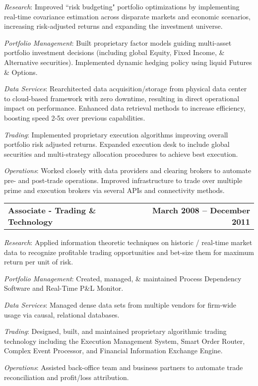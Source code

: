 \documentclass[12pt]{article}
\begin{document}
    \begin{list}{}{\leftmargin=1em}
      \item \textit{Research}: Improved ``risk budgeting" portfolio
        optimizations by implementing real-time covariance estimation across
        disparate markets and economic scenarios, increasing risk-adjusted returns
        and expanding the investment universe. 
      \item \textit{Portfolio Management}: Built proprietary factor models guiding
        multi-asset portfolio investment decisions (including global Equity, Fixed
        Income, \& Alternative securities). Implemented dynamic hedging policy
        using liquid Futures \& Options.
      \item \textit{Data Services}: Rearchitected data acquisition/storage 
        from physical data center to cloud-based framework with zero downtime,
        resulting in direct operational impact on performance. Enhanced data
        retrieval methods to increase efficiency, boosting speed 2-5x over
        previous capabilities.
      \item \textit{Trading}: Implemented proprietary execution algorithms
        improving overall portfolio risk adjusted returns. Expanded execution desk
        to include global securities and multi-strategy allocation procedures to
        achieve best execution.
      \item \textit{Operations}: Worked closely with data providers and clearing
        brokers to automate pre- and post-trade operations. Improved infrastructure
        to trade over multiple prime and execution brokers via several APIs and
        connectivity methods. 
    \end{list}
  \begin{tabular*}{7.5in}{@{\extracolsep{\fill}}lr}
    \textbf{Associate - Trading \& Technology} & \textbf{March 2008 -- December 2011}
  \end{tabular*}
    \begin{list}{}{\leftmargin=1em}
      \item \textit{Research}: Applied information theoretic techniques on historic
        / real-time market data to recognize profitable trading opportunities
        and bet-size them for maximum return per unit of risk.
      \item \textit{Portfolio Management}: Created, managed, \& maintained Process
        Dependency Software and Real-Time P\&L Monitor.
      \item \textit{Data Services}: Managed dense data sets from multiple vendors
        for firm-wide usage via causal, relational databases.
      \item \textit{Trading}: Designed, built, and maintained proprietary algorithmic
        trading technology including the Execution Management System, Smart Order
        Router, Complex Event Processor, and Financial Information Exchange Engine.
      \item \textit{Operations}: Assisted back-office team and business
        partners to automate trade reconciliation and profit/loss attribution.
    \end{list}
\end{document}
